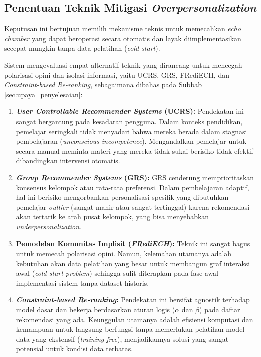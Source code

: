 \subsection{Penentuan Teknik Mitigasi \textit{Overpersonalization}}
\label{ssec:keputusan_mitigasi_bubble}
Keputusan ini bertujuan memilih mekanisme teknis untuk memecahkan \textit{echo chamber} yang dapat beroperasi secara otomatis dan layak diimplementasikan secepat mungkin tanpa data pelatihan (\textit{cold-start}).

Sistem mengevaluasi empat alternatif teknik yang dirancang untuk mencegah polarisasi opini dan isolasi informasi, yaitu UCRS, GRS, FRediECH, dan \textit{Constraint-based Re-ranking}, sebagaimana dibahas pada Subbab \ref{sec:upaya_penyelesaian}:

\begin{enumerate}
    \item \textbf{\textit{User Controllable Recommender Systems} (UCRS):} Pendekatan ini sangat bergantung pada kesadaran pengguna. Dalam konteks pendidikan, pemelajar seringkali tidak menyadari bahwa mereka berada dalam stagnasi pembelajaran (\textit{unconscious incompetence}). Mengandalkan pemelajar untuk secara manual meminta materi yang mereka tidak sukai berisiko tidak efektif dibandingkan intervensi otomatis.

    \item \textbf{\textit{Group Recommender Systems} (GRS):} GRS cenderung memprioritaskan konsensus kelompok atau rata-rata preferensi. Dalam pembelajaran adaptif, hal ini berisiko mengorbankan personalisasi spesifik yang dibutuhkan pemelajar \textit{outlier} (sangat mahir atau sangat tertinggal) karena rekomendasi akan tertarik ke arah pusat kelompok, yang bisa menyebabkan \textit{underpersonalization}.

    \item \textbf{Pemodelan Komunitas Implisit (\textit{FRediECH}):} Teknik ini sangat bagus untuk memecah polarisasi opini. Namun, kelemahan utamanya adalah kebutuhan akan data pelatihan yang besar untuk membangun graf interaksi awal (\textit{cold-start problem}) sehingga sulit diterapkan pada fase awal implementasi sistem tanpa dataset historis.

    \item \textbf{\textit{Constraint-based Re-ranking}:} Pendekatan ini bersifat agnostik terhadap model dasar dan bekerja berdasarkan aturan logis ($\alpha$ dan $\beta$) pada daftar rekomendasi yang ada. Keunggulan utamanya adalah efisiensi komputasi dan kemampuan untuk langsung berfungsi tanpa memerlukan pelatihan model data yang ekstensif (\textit{training-free}), menjadikannya solusi yang sangat potensial untuk kondisi data terbatas.
\end{enumerate}

